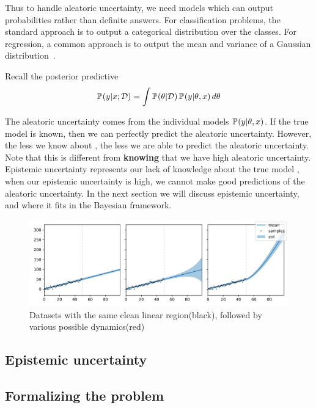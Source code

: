 \documentclass[../main.tex]{subfiles}
\begin{document}
Thus to handle aleatoric uncertainty, we need models which can output probabilities rather than definite answers. For classification problems, the standard approach is to output a categorical distribution over the classes. For regression, a common approach is to output the mean and variance of a Gaussian distribution~\citep{kendall2017uncertainties, goodfellow2016deep}. 

Recall the posterior predictive 
$$
    \mathbb{P}_{}(y|x; \mathcal{D})=  \int \mathbb{P}_{}(\theta | \mathcal{D})\, \mathbb{P}_{}(y|\theta, x) \, d\theta
$$

The aleatoric uncertainty comes from the individual models $\mathbb{P}_{}(y|\theta, x)$. If the true model  is known, then we can perfectly predict the aleatoric uncertainty. However, the less we know about , the less we are able to predict the aleatoric uncertainty. Note that this is different from \textbf{knowing} that we have high aleatoric uncertainty. 
Epistemic uncertainty represents our lack of knowledge about the true model , when our epistemic uncertainty is high, we cannot make good predictions of the aleatoric uncertainty. In the next section we will discuss epistemic uncertainty, and where it fits in the Bayesian framework. 


\begin{figure}
    \centering
    \includegraphics[width=1\textwidth]{Background/uncertainty_beliefs.png}
    \caption{Datasets with the same clean linear region(black), followed by various possible dynamics(red)}
    \label{fig:uncertainty_toy}
\end{figure}

\subsection{Epistemic uncertainty}



\subsection{Formalizing the problem}
\end{document}
